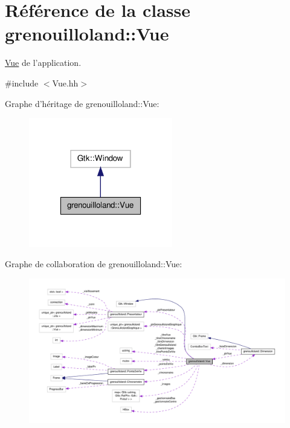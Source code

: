 \hypertarget{classgrenouilloland_1_1Vue}{\section{Référence de la classe grenouilloland\-:\-:Vue}
\label{classgrenouilloland_1_1Vue}
}


\hyperlink{classgrenouilloland_1_1Vue}{Vue} de l'application.  




{\ttfamily \#include $<$Vue.\-hh$>$}



Graphe d'héritage de grenouilloland\-:\-:Vue\-:
\nopagebreak
\begin{figure}[H]
\begin{center}
\leavevmode
\includegraphics[width=178pt]{classgrenouilloland_1_1Vue__inherit__graph}
\end{center}
\end{figure}


Graphe de collaboration de grenouilloland\-:\-:Vue\-:
\nopagebreak
\begin{figure}[H]
\begin{center}
\leavevmode
\includegraphics[width=350pt]{classgrenouilloland_1_1Vue__coll__graph}
\end{center}
\end{figure}
